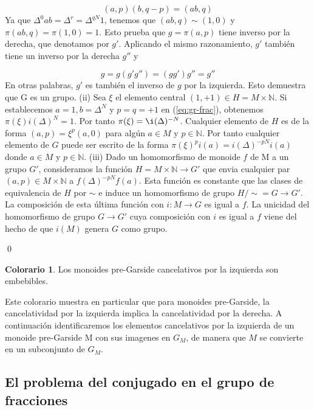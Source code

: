 \documentclass[12pt]{article}
\theoremstyle{definition}
\newtheorem{colo}{Colorario}[section]
\begin{document}
\begin{equation}
(a,p)(b,q-p)=(ab,q)
\label{eq:gr-frac}
\end{equation}
\newline
Ya que $\Delta^0ab=\Delta^r=\Delta^{qN}1$, tenemos que $(ab,q)\sim(1,0)$ y $\pi(ab,q)=\pi(1,0)=1$. Esto prueba que $g=\pi(a,p)$ tiene inverso por la derecha, que denotamos por $g'$. Aplicando el mismo razonamiento, $g'$ también tiene un inverso por la derecha  $g''$ y

$$g=g(g'g'')=(gg')g''=g''$$
\newline
En otras palabras, $g'$ es también el inverso de $g$ por la izquierda. Esto demuestra que G es un grupo.
(ii) Sea $\xi$ el elemento central $(1,+1)\in H=M\times\mathbb{N}$. Si establecemos $a=1,b=\Delta^N$ y $p=q=+1$ en (\ref{eq:gr-frac}), obtenemos $\pi(\xi)i(\Delta)^N=1$. Por tanto $\pi(\xi)=\i(\Delta)^{-N}$. Cualquier elemento de $H$ es de la forma $(a,p)=\xi^p(a,0)$ para algún $a\in M$ y $p\in\mathbb{N}$. Por tanto cualquier elemento de $G$ puede ser escrito de la forma $\pi(\xi)^pi(a)=i(\Delta)^{-pN}i(a)$ donde $a\in M$ y $p\in\mathbb{N}$.
\newline
\newline
(iii) Dado un homomorfismo de monoide $f$ de M a un grupo $G'$, consideramos la función $H=M\times \mathbb{N}\rightarrow G'$ que envia cualquier par $(a,p)\in M\times \mathbb{N}$ a $f(\Delta)^{-pN}f(a)$. Esta función es constante que las clases de equivalencia de $H$ por $\sim$ e induce un homomorfismo de grupo $H/\sim=G\rightarrow G'$. La composición de esta última función con $i:M\rightarrow G$ es igual a $f$. La unicidad del homomorfismo de grupo $G\rightarrow G'$ cuya composición con $i$ es igual a $f$ viene del hecho de que $i(M)$ genera $G$ como grupo.

\qed

\begin{colo}
Los monoides pre-Garside cancelativos por la izquierda son embebibles.
\end{colo}

Este colorario muestra en particular que para monoides pre-Garside, la cancelatividad por la izquierda implica la cancelatividad por la derecha.
\newline
\newline
A continuación identificaremos los elementos cancelativos por la izquierda de un monoide pre-Garside M con sus imagenes en $G_M$, de manera que $M$ se convierte en un subconjunto de $G_M$.

\subsection{El problema del conjugado en el grupo de fracciones}
\end{document}
